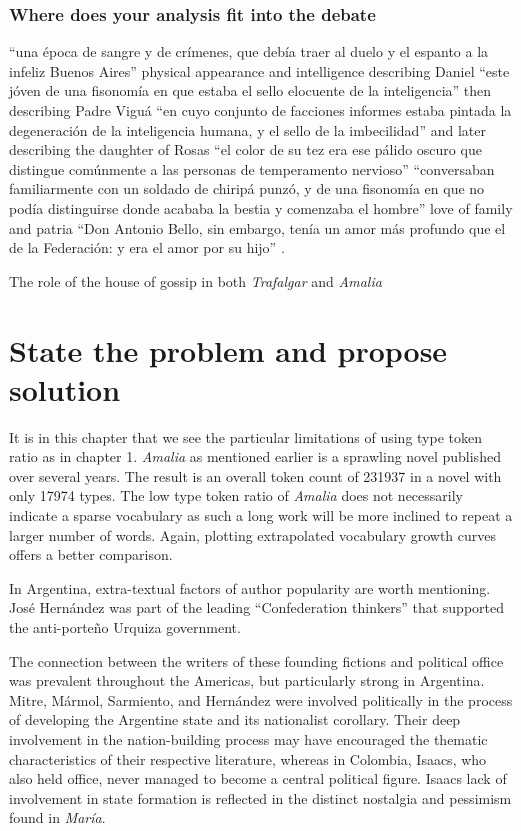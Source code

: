 \documentclass[12pt]{report}
\begin{document}
\subsubsection{Where does your analysis fit into the debate}
\enquote{una época de sangre y de crímenes, que debía traer al duelo y el espanto a la infeliz Buenos Aires} \autocite[30]{Marmol1926}
physical appearance and intelligence describing Daniel \enquote{este jóven de una fisonomía en que estaba el sello elocuente de la inteligencia}
then describing Padre Viguá \enquote{en cuyo conjunto de facciones informes estaba pintada la degeneración de la inteligencia humana, y el sello de la imbecilidad}	
and later describing the daughter of Rosas \enquote{el color de su tez era ese pálido oscuro que distingue comúnmente a las personas de temperamento nervioso}
\autocite[41]{Marmol1926}
\enquote{conversaban familiarmente con un soldado de chiripá punzó, y de una fisonomía en que no podía distinguirse donde acababa la bestia y comenzaba el hombre} \autocite[52]{Marmol1926}
love of family and patria \enquote{Don Antonio Bello, sin embargo, tenía un amor más profundo que el de la Federación: y era el amor por su hijo} \autocite[34]{Marmol1926}. 

The role of the house of gossip in both \textit{Trafalgar} and \textit{Amalia}

\section{State the problem and propose solution}
It is in this chapter that we see the particular limitations of using type token ratio as in chapter 1.
\textit{Amalia} as mentioned earlier is a sprawling novel published over several years.
The result is an overall token count of 231937 in a novel with only 17974 types.
The low type token ratio of \textit{Amalia} does not necessarily indicate a sparse vocabulary as such a long work will be more inclined to repeat a larger number of words.
Again, plotting extrapolated vocabulary growth curves offers a better comparison.



In Argentina, extra-textual factors of author popularity are worth mentioning. José Hernández was part of the leading \enquote{Confederation thinkers} that supported the anti-porteño Urquiza government.

The connection between the writers of these founding fictions and political office was prevalent throughout the Americas, but particularly strong in Argentina.
Mitre, Mármol, Sarmiento, and Hernández were involved politically in the process of developing the Argentine state and its nationalist corollary.
Their deep involvement in the nation-building process may have encouraged the thematic characteristics of their respective literature, whereas in Colombia, Isaacs, who also held office, never managed to become a central political figure.
Isaacs lack of involvement in state formation is reflected in the distinct nostalgia and pessimism found in \textit{María}.
\end{document}
